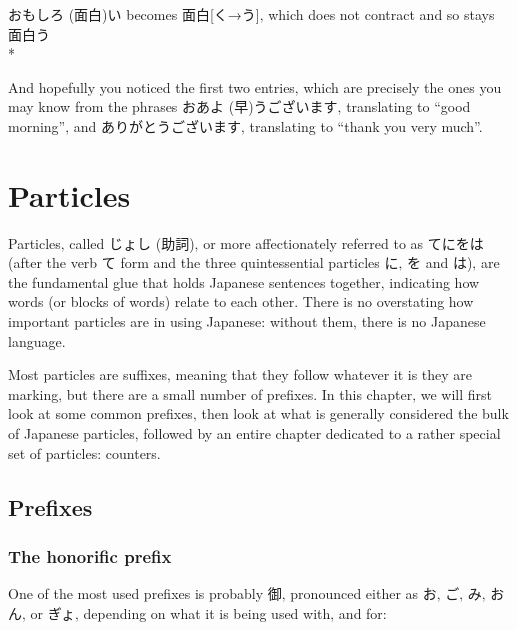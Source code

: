 \documentclass[11pt, b5paper, twoside, openright, onecolumn]{book}
\makeatletter
\newcommand*{\rubystack}[2]{{\relscale{0.5}%
  \begin{tabular}[b]{@{}c@{}}%
    {#1}\\%
   {\textscale{2}{#2}}%
  \end{tabular}}%
}
\DeclareRobustCommand*{\ruby}[2]{%
  \mbox{%
    \setlength{\parskip}{0ex}%
    \BeginAccSupp{method=pdfstringdef,ActualText={#1}}%
      \rubystack{\phantom{#2}}{#1}%
      \llap{%
        \rubystack{#2}{\phantom{#1}}%
      }%
    \EndAccSupp{}%
  }%
}
\renewcommand*{\ruby}[2]{#2 (#1)}%
\newenvironment{exampleblock}{
\setlength{\parindent}{0.6in}
\begin{minipage}[t]{\dimexpr\textwidth-\parindent}}
{\end{minipage}}
\makeatother
\begin{document}
\vspace{0.4cm}
\begin{exampleblock}
\ruby{面白}{おもしろ}い becomes 面白[く→う]‚ which does not contract and so stays 面白う \\* 
\end{exampleblock}
\vspace{0.2cm}

And hopefully you noticed the first two entries‚ which are precisely the ones you may know from the phrases お\ruby{早}{あよ}うございます‚ translating to “good morning”‚ and ありがとうございます‚ translating to “thank you very much”.


\chapter{Particles}

Particles‚ called \ruby{助詞}{じょし}‚ or more affectionately referred to as てにをは (after the verb て form and the three quintessential particles に‚ を and は)‚ are the fundamental glue that holds Japanese sentences together‚ indicating how words (or blocks of words) relate to each other. There is no overstating how important particles are in using Japanese: without them‚ there is no Japanese language.

Most particles are suffixes‚ meaning that they follow whatever it is they are marking‚ but there are a small number of prefixes. In this chapter‚ we will first look at some common prefixes‚ then look at what is generally considered the bulk of Japanese particles‚ followed by an entire chapter dedicated to a rather special set of particles: counters.

\section{Prefixes}

\subsection{The honorific prefix}

One of the most used prefixes is probably 御‚ pronounced either as お‚ ご‚ み‚ おん‚ or ぎょ‚ depending on what it is being used with‚ and for:
\end{document}
